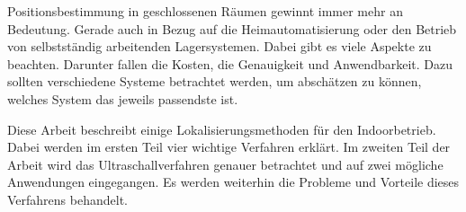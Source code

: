 Positionsbestimmung in geschlossenen Räumen gewinnt immer mehr an Bedeutung.
Gerade auch in Bezug auf die Heimautomatisierung oder den Betrieb von
selbstständig arbeitenden Lagersystemen. Dabei gibt es viele Aspekte zu
beachten. Darunter fallen die Kosten, die Genauigkeit und Anwendbarkeit.
Dazu sollten verschiedene Systeme betrachtet werden, um abschätzen zu können,
welches System das jeweils passendste ist.

Diese Arbeit beschreibt einige Lokalisierungsmethoden für den Indoorbetrieb.
Dabei werden im ersten Teil vier wichtige Verfahren erklärt. Im zweiten Teil
der Arbeit wird das Ultraschallverfahren genauer betrachtet und auf zwei mögliche
Anwendungen eingegangen. Es werden weiterhin die Probleme und Vorteile dieses
Verfahrens behandelt.

